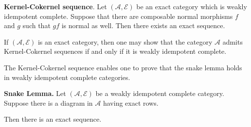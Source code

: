     \begin{lemma}
        \textbf{Kernel-Cokernel sequence}.
        Let $(\mathcal{A},\mathcal{E})$ be an exact category which is weakly idempotent complete. Suppose that there are composable normal morphisms $f$ and $g$ such that $gf$ is normal as well. Then there exists an exact sequence.
        \begin{center}
        \end{center} 
    \end{lemma}


    \begin{remark}
        If $(\mathcal{A},\mathcal{E})$ is an exact category, then one may show that the category $\mathcal{A}$ admits Kernel-Cokernel sequences if and only if it is weakly idempotent complete.
    \end{remark}

    The Kernel-Cokernel sequence enables one to prove that the snake lemma holds in weakly idempotent complete categories.

    \begin{corollary}
        \textbf{Snake Lemma.}
        Let $(\mathcal{A},\mathcal{E})$ be a weakly idempotent complete category. Suppose there is a diagram in $\mathcal{A}$ having exact rows.
        \begin{center}
        \end{center}

        Then there is an exact sequence.
        \begin{center}
        \end{center}
    \end{corollary}

